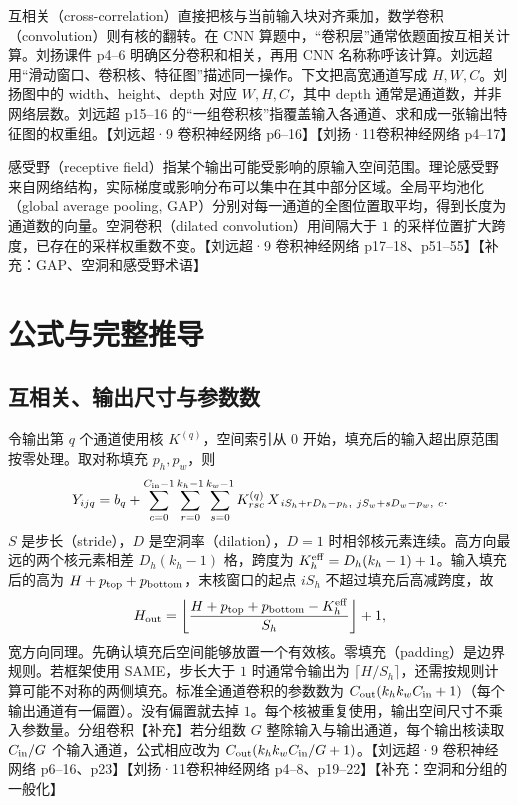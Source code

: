 \documentclass[UTF8,a4paper,zihao=-4,fontset=fandol]{ctexrep}
\begin{document}
互相关（cross-correlation）直接把核与当前输入块对齐乘加，数学卷积（convolution）则有核的翻转。在 CNN 算题中，“卷积层”通常依题面按互相关计算。刘扬课件 p4--6 明确区分卷积和相关，再用 CNN 名称称呼该计算。刘远超用“滑动窗口、卷积核、特征图”描述同一操作。下文把高宽通道写成 $H,W,C$。刘扬图中的 width、height、depth 对应 $W,H,C$，其中 depth 通常是通道数，并非网络层数。刘远超 p15--16 的“一组卷积核”指覆盖输入各通道、求和成一张输出特征图的权重组。【刘远超·9 卷积神经网络 p6--16】【刘扬·11卷积神经网络 p4--17】

感受野（receptive field）指某个输出可能受影响的原输入空间范围。理论感受野来自网络结构，实际梯度或影响分布可以集中在其中部分区域。全局平均池化（global average pooling, GAP）分别对每一通道的全图位置取平均，得到长度为通道数的向量。空洞卷积（dilated convolution）用间隔大于 $1$ 的采样位置扩大跨度，已存在的采样权重数不变。【刘远超·9 卷积神经网络 p17--18、p51--55】【补充：GAP、空洞和感受野术语】

\section{公式与完整推导}

\subsection*{互相关、输出尺寸与参数数}

令输出第 $q$ 个通道使用核 $K^{(q)}$，空间索引从 $0$ 开始，填充后的输入超出原范围按零处理。取对称填充 $p_h,p_w$，则
\[
 Y_{ijq}=b_q+
 \sum_{c=0}^{C_{\rm in}-1}
 \sum_{r=0}^{k_h-1}\sum_{s=0}^{k_w-1}
 K^{(q)}_{rsc}\,X_{\,iS_h+rD_h-p_h,\ jS_w+sD_w-p_w,\ c}.
\]
$S$ 是步长（stride），$D$ 是空洞率（dilation），$D=1$ 时相邻核元素连续。高方向最远的两个核元素相差 $D_h(k_h-1)$ 格，跨度为 $K_h^{\rm eff}=D_h(k_h-1)+1$。输入填充后的高为 $H+p_{\rm top}+p_{\rm bottom}$，末核窗口的起点 $iS_h$ 不超过填充后高减跨度，故
\[
 H_{\rm out}=\left\lfloor
 \frac{H+p_{\rm top}+p_{\rm bottom}-K_h^{\rm eff}}{S_h}
 \right\rfloor+1,
\]
宽方向同理。先确认填充后空间能够放置一个有效核。零填充（padding）是边界规则。若框架使用 SAME，步长大于 $1$ 时通常令输出为 $\lceil H/S_h\rceil$，还需按规则计算可能不对称的两侧填充。标准全通道卷积的参数数为 $C_{\rm out}(k_hk_w C_{\rm in}+1)$（每个输出通道有一偏置）。没有偏置就去掉 $1$。每个核被重复使用，输出空间尺寸不乘入参数量。分组卷积【补充】若分组数 $G$ 整除输入与输出通道，每个输出核读取 $C_{\rm in}/G$ 个输入通道，公式相应改为 $C_{\rm out}(k_hk_w C_{\rm in}/G+1)$。【刘远超·9 卷积神经网络 p6--16、p23】【刘扬·11卷积神经网络 p4--8、p19--22】【补充：空洞和分组的一般化】
\end{document}
